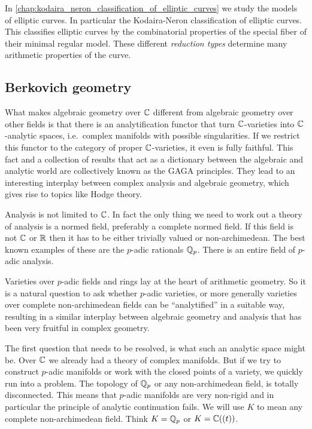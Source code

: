 In \cref{chap:kodaira_neron_classification_of_elliptic_curves} we study the models of elliptic curves. 
In particular the Kodaira-Neron classification of elliptic curves. 
This classifies elliptic curves by the combinatorial properties of the special fiber of their minimal regular model. 
These different \emph{reduction types} determine many arithmetic properties of the curve.

\subsection{Berkovich geometry} \label{sec:berkovich_geometry}
What makes algebraic geometry over $\mathbb{C}$ different from algebraic geometry over other fields is that there is an analytification functor that turn $\mathbb{C}$-varieties into $\mathbb{C}$-analytic spaces, i.e.\ complex manifolds with possible singularities. 
If we restrict this functor to the category of proper  $\mathbb{C}$-varieties, it even is fully faithful. 
This fact and a collection of results that act as a dictionary between the algebraic and analytic world are collectively known as the GAGA principles. 
They lead to an interesting interplay between complex analysis and algebraic geometry, which gives rise to topics like Hodge theory. 

Analysis is not limited to $\mathbb{C}$. 
In fact the only thing we need to work out a theory of analysis is a normed field, preferably a complete normed field. 
If this field is not $\mathbb{C}$ or $\mathbb{R}$ then it has to be either trivially valued or non-archimedean. 
The best known examples of these are the $p$-adic rationals $\mathbb{Q}_p$. 
There is an entire field of $p$-adic analysis.  

Varieties over $p$-adic fields and rings lay at the heart of arithmetic geometry. 
So it is a natural question to ask whether $p$-adic varieties, or more generally varieties over complete non-archimedean fields can be ``analytified'' in a suitable way, resulting in a similar interplay between algebraic geometry and analysis that has been very fruitful in complex geometry. 

The first question that needs to be resolved, is what such an analytic space might be.
Over $\mathbb{C}$ we already had a theory of complex manifolds.
But if we try to construct $p$-adic manifolds or work with the closed points of a variety, we quickly run into a problem.
The topology of $\mathbb{Q}_p$ or any non-archimedean field, is totally disconnected. 
This means that $p$-adic manifolds are very non-rigid and in particular the principle of analytic continuation fails. 
We will use $K$ to mean any complete non-archimedean field. Think $K = \mathbb{Q}_p$ or $K = \mathbb{C}((t))$. 

